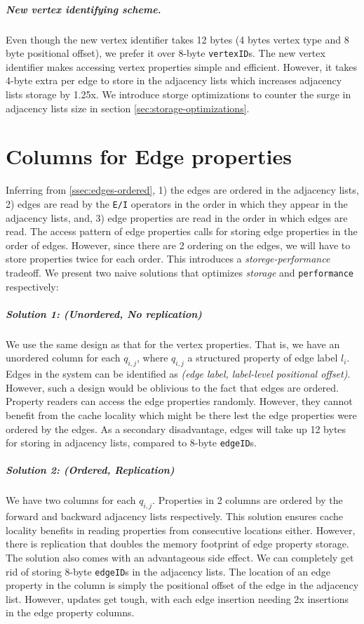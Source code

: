 \vspace{-12pt}
\subparagraph{New vertex identifying scheme.}Even though the new vertex identifier takes 12 bytes (4 bytes vertex type and 8 byte positional offset), we prefer it over 8-byte \texttt{vertexID}s. The new vertex identifier makes accessing vertex properties simple and efficient. However, it takes 4-byte extra per edge to store in the adjacency lists which increases adjacency lists storage by 1.25x. We introduce storge optimizations to counter the surge in adjacency lists size in section \ref{sec:storage-optimizations}.

\section{Columns for Edge properties}
\label{sec:edge-property-columns}

Inferring from \ref{ssec:edges-ordered}, 1) the edges are ordered in the adjacency lists, 2) edges are read by the \texttt{E/I} operators in the order in which they appear in the adjacency lists, and, 3) edge properties are read in the order in which edges are read. The access pattern of edge properties calls for storing edge properties in the order of edges. However, since there are 2 ordering on the edges, we will have to store properties twice for each order. This introduces a \emph{storege-performance} tradeoff. We present two naive solutions that optimizes \emph{storage} and \texttt{performance} respectively:

\vspace{-12pt}
\subparagraph{Solution 1: (Unordered, No replication) } We use the same design as that for the vertex properties. That is, we have an unordered column for each $q_{i,j}$, where $q_{i,j}$ a structured property of edge label $l_i$. Edges in the system can be identified as \emph{(edge label, label-level positional offset)}. However, such a design would be oblivious to the fact that edges are ordered. Property readers can access the edge properties randomly. However, they cannot benefit from the cache locality which might be there lest the edge properties were ordered by the edges. As a secondary disadvantage, edges will take up 12 bytes for storing in adjacency lists, compared to 8-byte \texttt{edgeID}s.

\vspace{-12pt}
\subparagraph{Solution 2: (Ordered, Replication) } We have two columns for each $q_{i,j}$. Properties in 2 columns are ordered by the forward and backward adjacency lists respectively. This solution ensures cache locality benefits in reading properties from consecutive locations either. However, there is replication that doubles the memory footprint of edge property storage. The solution also comes with an advantageous side effect. We can completely get rid of storing 8-byte \texttt{edgeID}s in the adjacency lists. The location of an edge property in the column is simply the positional offset of the edge in the adjacency list. However, updates get tough, with each edge insertion needing 2x insertions in the edge property columns.

